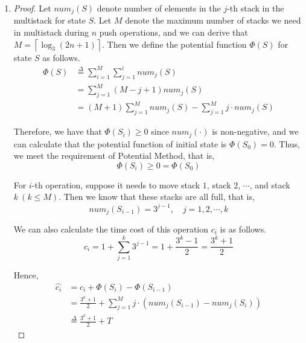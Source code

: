 \documentclass[12pt,a4paper]{article}
\theoremstyle{definition}
\begin{document}
\begin{enumerate}
\begin{enumerate}
\begin{proof}
        Hence, the amortized cost of one push operation is $O(\log{n})$
    \end{proof}

    \item
    \begin{proof}
        Let $num_j(S)$ denote number of elements in the $j$-th stack in the multistack for state $S$. Let $M$ denote the maximum number of stacks we need in multistack during $n$ push operations, and we can derive that $M = \left\lceil \log_3{(2n+1)} \right\rceil$. Then we define the potential function $\Phi(S)$ for state $S$ as follows.
        \begin{displaymath}
        \begin{aligned}
        \Phi(S) &\stackrel{\Delta}{=} \sum_{i = 1}^{M} {\sum_{j = 1}^i {num_j(S)}} \\
                &= \sum_{j=1}^{M} (M-j+1) num_j(S) \\
                &= (M+1) \sum_{j=1}^{M} num_j(S) - \sum_{j=1}^{M} j \cdot num_j(S)
        \end{aligned}
        \end{displaymath}

        Therefore, we have that $\Phi(S_i) \geq 0$ since $num_j(\cdot)$ is non-negative, and we can calculate that the potential function of initial state is $\Phi(S_0) = 0$. Thus, we meet the requirement of Potential Method, that is,
        \begin{displaymath}
        \Phi(S_i) \geq 0 = \Phi(S_0)
        \end{displaymath}

        For $i$-th operation, suppose it needs to move stack $1$, stack $2$, $\cdots$, and stack $k\ (k \leq M)$. Then we know that these stacks are all full, that is,
        \begin{displaymath}
        num_j(S_{i-1}) = 3^{j-1}, \quad j = 1,2,\cdots, k
        \end{displaymath}

        We can also calculate the time cost of this operation $c_i$ is as follows.
        \begin{equation}
        c_i = 1 + \sum_{j=1}^k 3^{j-1} = 1 + \frac{3^k - 1}{2} = \frac{3^k + 1}{2}
        \end{equation}

        Hence,
        \begin{equation}
        \begin{aligned}
        \hat{c_i} &= c_i + \Phi(S_i) - \Phi(S_{i-1}) \\
                  &= \frac{3^k + 1}{2} + \sum_{j=1}^M j \cdot (num_j(S_{i-1}) - num_j(S_i)) \\
                  &\stackrel{\Delta}{=} \frac{3^k + 1}{2} + T
        \end{aligned}
        \label{eq2-3-1}
        \end{equation}


\end{proof}
\end{enumerate}
\end{enumerate}
\end{document}

